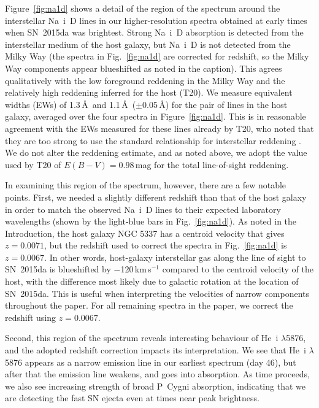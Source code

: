 \documentclass[fleqn,usenatbib,useAMS]{mnras}
\begin{document}
Figure~\ref{fig:na1d} shows a detail of the region of the spectrum around the interstellar Na~{\sc i}~D lines in our higher-resolution spectra obtained at early times when SN~2015da was brightest.  Strong Na~{\sc i}~D absorption is detected from the interstellar medium of the host galaxy, but Na~{\sc i}~D is not detected from the Milky Way (the spectra in Fig.~\ref{fig:na1d} are corrected for redshift, so the Milky Way components appear blueshifted as noted in the caption).  This agrees qualitatively with the low foreground reddening in the Milky Way and the relatively high reddening inferred for the host (T20).  We measure equivalent widths (EWs) of 1.3\,\AA\ and 1.1\,\AA\ ($\pm$0.05\,\AA) for the pair of lines in the host galaxy, averaged over the four spectra in Figure~\ref{fig:na1d}.  This is in reasonable agreement with the EWs measured for these lines already by T20, who noted that they are too strong to use the standard relationship for interstellar reddening \citep{2012MNRAS.426.1465P}.  We do not alter the reddening estimate, and as noted above, we adopt the value used by T20 of $E(B-V)=0.98$\,mag for the total line-of-sight reddening.

In examining this region of the spectrum, however, there are a few notable points.  First, we needed a slightly different redshift than that of the host galaxy in order to match the observed Na~{\sc i}~D lines to their expected laboratory wavelengths (shown by the light-blue bars in Fig.~\ref{fig:na1d}).  As noted in the Introduction, the host galaxy NGC 5337 has a centroid velocity that gives $z=0.0071$, but the redshift used to correct the spectra in Fig.~\ref{fig:na1d} is $z=0.0067$.  In other words, host-galaxy interstellar gas along the line of sight to SN~2015da is blueshifted by $-$120\,km\,s$^{-1}$ compared to the centroid velocity of the host, with the difference most likely due to galactic rotation at the location of SN~2015da.  This is useful when interpreting the velocities of narrow components throughout the paper.  For all remaining spectra in the paper, we correct the redshift using $z=0.0067$.

Second, this region of the spectrum reveals interesting behaviour of He~{\sc i} $\lambda$5876, and the adopted redshift correction impacts its interpretation.  We see that  He~{\sc i} $\lambda$5876 appears as a narrow emission line in our earliest spectrum (day 46), but after that the emission line weakens, and goes into absorption.  As time proceeds, we also see increasing strength of broad P~Cygni absorption, indicating that we are detecting the fast SN ejecta even at times near peak brightness.  
\end{document}
